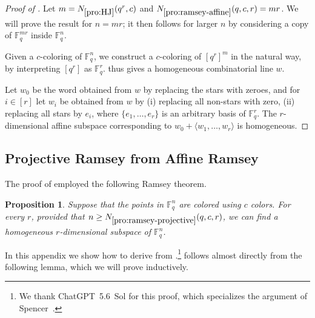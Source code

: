 \documentclass{article}
\newtheorem{proposition}[theorem]{Proposition}
\theoremstyle{definition}
\providecommand{\FF}{\mathbb{F}}
\providecommand{\Nramaff}{N_{\ref{pro:ramsey-affine}}}
\providecommand{\Nrampro}{N_{\ref{pro:ramsey-projective}}}
\providecommand{\NHJ}{N_{\ref{pro:HJ}}}
\begin{document}
\begin{proof}[Proof of ]
Let $m = \NHJ(q^r,c)$ and $\Nramaff(q,c,r) = mr$. We will prove the result for $n = mr$; it then follows for larger $n$ by considering a copy of $\FF_q^{mr}$ inside $\FF_q^n$.

Given a $c$-coloring of $\FF_q^n$, we construct a $c$-coloring of $[q^r]^m$ in the natural way, by interpreting $[q^r]$ as $\FF_q^r$.  thus gives a homogeneous combinatorial line $w$.

Let $w_0$ be the word obtained from $w$ by replacing the stars with zeroes, and for $i \in [r]$ let $w_i$ be obtained from $w$ by (i) replacing all non-stars with zero, (ii) replacing all stars by $e_i$, where $\{e_1,\dots,e_r\}$ is an arbitrary basis of $\FF_q^r$. The $r$-dimensional affine subspace corresponding to $w_0 + \langle w_1,\dots,w_r \rangle$ is homogeneous.
\end{proof}

\subsection{Projective Ramsey from Affine Ramsey}
\label{sec:ramsey-projective}

The proof of  employed the following Ramsey theorem.

\begin{proposition} \label{pro:ramsey-projective}
Suppose that the points in $\FF_q^n$ are colored using $c$ colors. For every $r$, provided that $n \ge \Nrampro(q,c,r)$, we can find a homogeneous $r$-dimensional subspace of $\FF_q^n$.
\end{proposition}

In this appendix we show how to derive  from .\footnote{We thank ChatGPT~5.6~Sol for this proof, which specializes the argument of Spencer~\cite{Spencer79}.}
 follows almost directly from the following lemma, which we will prove inductively.
\end{document}

